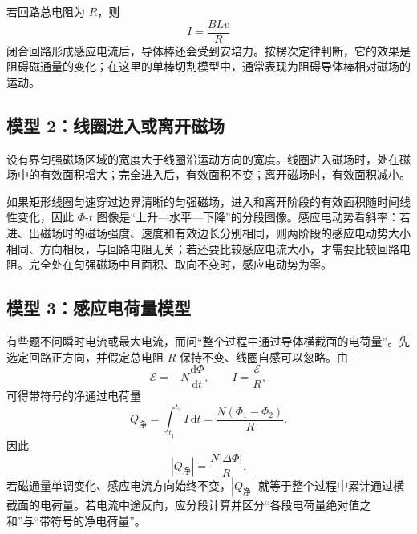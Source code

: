 若回路总电阻为 $R$，则
\[
I=\frac{BLv}{R}
\]
闭合回路形成感应电流后，导体棒还会受到安培力。按楞次定律判断，它的效果是阻碍磁通量的变化；在这里的单棒切割模型中，通常表现为阻碍导体棒相对磁场的运动。

\subsection*{模型 2：线圈进入或离开磁场}

设有界匀强磁场区域的宽度大于线圈沿运动方向的宽度。线圈进入磁场时，处在磁场中的有效面积增大；完全进入后，有效面积不变；离开磁场时，有效面积减小。

\begin{center}


\label{fig:coil-enter-field}
\end{center}

如果矩形线圈匀速穿过边界清晰的匀强磁场，进入和离开阶段的有效面积随时间线性变化，因此 $\Phi$-$t$ 图像是“上升—水平—下降”的分段图像。感应电动势看斜率：若进、出磁场时的磁场强度、速度和有效边长分别相同，则两阶段的感应电动势大小相同、方向相反，与回路电阻无关；若还要比较感应电流大小，才需要比较回路电阻。完全处在匀强磁场中且面积、取向不变时，感应电动势为零。

\begin{center}


\label{fig:coil-flux-current-graph}
\end{center}

\subsection*{模型 3：感应电荷量模型}

有些题不问瞬时电流或最大电流，而问“整个过程中通过导体横截面的电荷量”。先选定回路正方向，并假定总电阻 $R$ 保持不变、线圈自感可以忽略。由
\[
\mathcal E=-N\frac{\mathrm d\Phi}{\mathrm dt},
\qquad I=\frac{\mathcal E}{R},
\]
可得带符号的净通过电荷量
\[
\boxed{Q_{\text{净}}=\int_{t_1}^{t_2}I\,\mathrm dt
=\frac{N(\Phi_1-\Phi_2)}{R}}.
\]
因此
\[
\boxed{|Q_{\text{净}}|=\frac{N|\Delta\Phi|}{R}}.
\]
若磁通量单调变化、感应电流方向始终不变，$|Q_{\text{净}}|$ 就等于整个过程中累计通过横截面的电荷量。若电流中途反向，应分段计算并区分“各段电荷量绝对值之和”与“带符号的净电荷量”。

\begin{center}


\label{fig:induction-charge-area}
\end{center}

